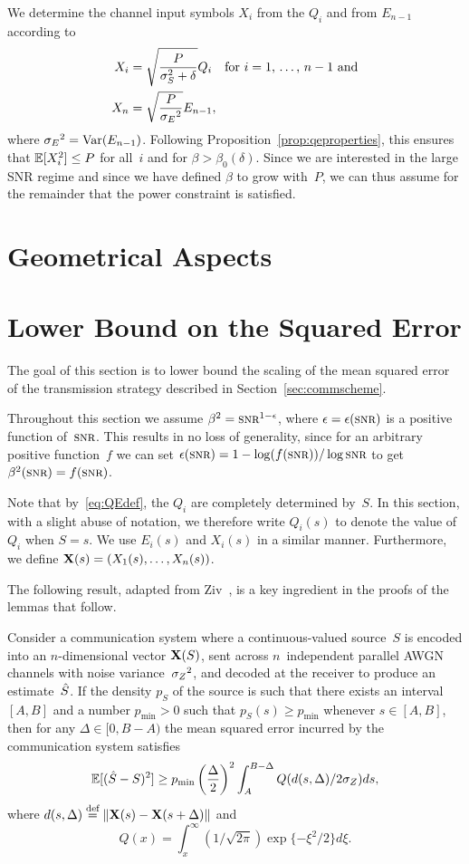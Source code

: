 We determine the channel input symbols $X_i$ from the $Q_i$ and from $E_{n-1}$
according to 
\begin{align}
  X_i &= \sqrt{\frac{P}{{\sigma_S^2} + \delta}} Q_i \quad
  \text{for $i = 1$, \dots, $n-1$ and} \nonumber\\
  X_n &= \sqrt{\frac{P}{{{\sigma_E}^2}}} E_{n-1},
  \label{eq:Xdef}
\end{align}
where ${{\sigma_E}^2} = \operatorname{Var}(E_{n-1})$.  Following Proposition~\ref{prop:qeproperties},
this ensures that $\mathbb{E}[X_i^2] \le P$ for all~$i$ and for $\beta >
\beta_0(\delta)$.  Since we are interested in the large SNR regime and since we
have defined $\beta$ to grow with~$P$, we can thus assume for the remainder that
the power constraint is satisfied. 


\section{Geometrical Aspects}

\section{Lower Bound on the Squared Error}

The goal of this section is to lower bound the scaling of the mean squared error
of the transmission strategy described in Section~\ref{sec:commscheme}.

Throughout this section we assume $\beta^2 = \snr^{1-\e}$, where $\e = \e(\snr)$
is a positive function of~$\snr$. This results in no loss of generality, since
for an arbitrary positive function~$f$ we can set $\e(\snr) =
1-\log(f(\snr))/\log\snr$ to get $\beta^2(\snr) = f(\snr)$.

Note that by~\eqref{eq:QEdef}, the $Q_i$ are completely determined by~$S$.
In this section, with a slight abuse of notation, we therefore write $Q_i(s)$ to
denote the value of~$Q_i$ when $S = s$. We use $E_i(s)$ and $X_i(s)$ in a
similar manner. Furthermore, we define $\mathbf{X}(s) = (X_1(s), \dots, X_n(s))$.

The following result, adapted from Ziv~\cite{Ziv1970}, is a key ingredient in
the proofs of the lemmas that follow.

\begin{lemma}
  \label{lem:zivbound}
  Consider a communication system where a con\-tin\-u\-ous-valued source~$S$ is
  encoded into an $n$-dimensional vector $\mathbf{X}(S)$, sent across $n$~independent
  parallel AWGN channels with noise variance~${{\sigma_Z}^2}$, and decoded at the receiver
  to produce an estimate~$\hat{S}$.  If the density $p_S$ of the source is such that
  there exists an interval $[A,B]$ and a number $p_{\min} > 0$ such that $p_S(s)
  \ge p_{\min}$ whenever $s \in [A,B]$, then for any $\Delta \in [0,B-A)$ the
  mean squared error incurred by the communication system satisfies
  \begin{equation}
    \label{eq:zivbound}
    \mathbb{E}[(\hat{S} - S)^2] \ge p_{\min} \left(\frac{\Delta}{2} \right)^2 
    \int_A^{B-\Delta} Q(d(s, \Delta) / 2 {\sigma_Z}) ds,
  \end{equation}
  where $d(s, \Delta) \stackrel{\text{def}}{=} \|\mathbf{X}(s) - \mathbf{X}(s+\Delta)\|$ and 
  \[Q(x) = \int_x^{\infty} (1/\sqrt{2\pi}) \exp\{-\xi^2/2\} d\xi.\]
\end{lemma}


